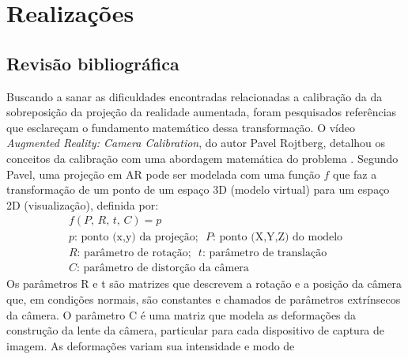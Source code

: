 \chapter{Realizações}

\section{Revisão bibliográfica}\label{chp:biblio}

Buscando a sanar as dificuldades encontradas relacionadas a calibração da da sobreposição da projeção da realidade aumentada, foram pesquisados referências que esclareçam o fundamento matemático dessa transformação. O vídeo \textit{Augmented Reality: Camera Calibration}, do autor Pavel Rojtberg, detalhou os conceitos da calibração com uma abordagem matemática do problema \cite{augmented-calib}. Segundo Pavel, uma projeção em AR pode ser modelada com uma função \(f\) que faz a transformação de um ponto de um espaço 3D (modelo virtual) para um espaço 2D (visualização), definida por: 
\begin{gather*}
    f(P,\,R,\,t,\,C) = p \\
    \text{$p$: ponto (x,y) da projeção; ~$P$: ponto (X,Y,Z) do modelo} \\
    \text{$R$: parâmetro de rotação; ~$t$: parâmetro de translação} \\
    \text{$C$: parâmetro de distorção da câmera} 
  \end{gather*}
Os parâmetros R e t são matrizes que descrevem a rotação e a posição da câmera que, em condições normais, são constantes e chamados de parâmetros extrínsecos da câmera. O parâmetro C é uma matriz que modela as deformações da construção da lente da câmera, particular para cada dispositivo de captura de imagem. As deformações variam sua intensidade e modo de 

